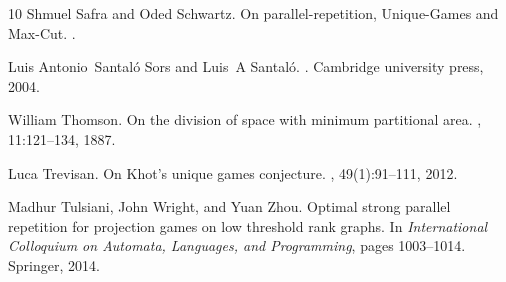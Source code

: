 \documentclass[10pt,a4paper]{article}
\begin{document}
\begin{thebibliography}{10}
Shmuel Safra and Oded Schwartz.
\newblock On parallel-repetition, {U}nique-{G}ames and {M}ax-{C}ut.
.

Luis Antonio~Santal{\'o} Sors and Luis~A Santal{\'o}.
.
\newblock Cambridge university press, 2004.

William Thomson.
\newblock On the division of space with minimum partitional area.
, 11:121--134, 1887.

Luca Trevisan.
\newblock On {K}hot's unique games conjecture.
, 49(1):91--111, 2012.

Madhur Tulsiani, John Wright, and Yuan Zhou.
\newblock Optimal strong parallel repetition for projection games on low
  threshold rank graphs.
\newblock In {\em International Colloquium on Automata, Languages, and
  Programming}, pages 1003--1014. Springer, 2014.

\end{thebibliography}
\end{document}
